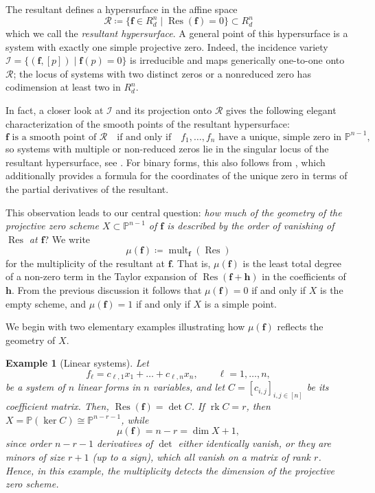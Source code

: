 \documentclass[11pt,letterpaper]{article}
\newtheorem{example}[theorem]{Example}\AddToHook{env/example/begin}{\crefalias{theorem}{example}}
\numberwithin{equation}{section}
\newcommand{\PP}{\mathbb{P}}
\newcommand{\cR}{\mathcal{R}}
\newcommand{\ff}{\ensuremath{\boldsymbol{f}}}
\newcommand{\hh}{\ensuremath{\boldsymbol{h}}}
\DeclareMathOperator{\rk}{rk}
\DeclareMathOperator{\Res}{Res}
\DeclareMathOperator{\mult}{mult}
\begin{document}
The resultant defines a hypersurface in the affine space \[
\cR \coloneqq \{\ff\in R_d^n\mid \Res(\ff)=0\}\subset R_d^n
\] which we call the \emph{resultant hypersurface}.
A general point of this hypersurface is a system with exactly one simple projective zero.
Indeed, the incidence variety $\mathcal{I}=\{(\ff,[p])\mid \ff(p)=0\}$ is irreducible and maps generically one-to-one onto $\cR$; the locus of systems with two distinct zeros or a nonreduced zero has codimension at least two in $R_d^n$.

In fact, a closer look at $\mathcal{I}$ and its projection onto $\cR$ gives the following elegant characterization of the smooth points of the resultant hypersurface: \[
\ff\text{ is a smooth point of }\cR\quad\text{if and only if}\quad f_1,\dots,f_n\text{ have a unique, simple zero in }\PP^{n-1},
\] so systems with multiple or non-reduced zeros lie in the singular locus of the resultant hypersurface, see \cite[Proposition~4.2]{GGTV-23}.
For binary forms, this also follows from \cite[Chapter~3, Corollary~3.7]{GKZ-08}, which additionally provides a formula for the coordinates of the unique zero in terms of the partial derivatives of the resultant.

This observation leads to our central question:
\emph{how much of the geometry of the projective zero scheme $X\subset\PP^{n-1}$ of $\ff$ is described by the order of vanishing of $\Res$ at $\ff$}?
We write \[
\mu(\ff) \coloneqq \mult_{\ff}(\Res)
\] for the multiplicity of the resultant at $\ff$.
That is, $\mu(\ff)$ is the least total degree of a non-zero term in the Taylor expansion of $\Res(\ff+\hh)$ in the coefficients of $\hh$.
From the previous discussion it follows that $\mu(\ff)=0$ if and only if $X$ is the empty scheme, and $\mu(\ff)=1$ if and only if $X$ is a simple point.

We begin with two elementary examples illustrating how $\mu(\ff)$ reflects the geometry of $X$.

\begin{example}[Linear systems]
\label{ex:linear}
Let \[
f_\ell=c_{\ell,1}x_1+\dots+c_{\ell,n}x_n,\qquad \ell=1,\ldots,n,
\] be a system of $n$ linear forms in $n$ variables, and let $C=[c_{i,j}]_{i,j\in [n]}$ be its coefficient matrix.
Then, $\Res(\ff)=\det C$.
If $\rk C=r$, then $X=\PP(\ker C)\cong\PP^{n-r-1}$, while \[
\mu(\ff) = n-r = \dim X + 1,
\] since order $n-r-1$ derivatives of $\det$ either identically vanish, or they are minors of size $r+1$ (up to a sign), which all vanish on a matrix of rank $r$.
Hence, in this example, the multiplicity detects the dimension of the projective zero scheme.
\end{example}
\end{document}
